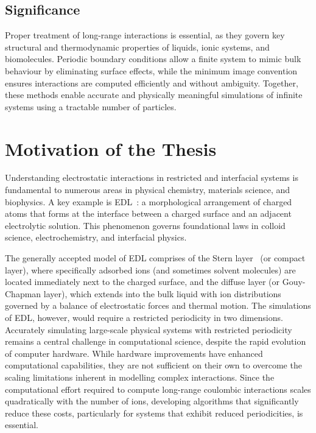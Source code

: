 \subsection{Significance}
Proper treatment of long-range interactions is essential, as they govern key structural and thermodynamic properties of liquids, ionic systems, and biomolecules. Periodic boundary conditions allow a finite system to mimic bulk behaviour by eliminating surface effects, while the minimum image convention ensures interactions are computed efficiently and without ambiguity. Together, these methods enable accurate and physically meaningful simulations of infinite systems using a tractable number of particles.

\section{Motivation of the Thesis}
Understanding electrostatic interactions in restricted and interfacial systems is fundamental to numerous areas in physical chemistry, materials science, and biophysics. A key example is \ac{EDL}~\cite{EDLbook,stillinger1960theory,grahame1947electrical}: a morphological arrangement of charged atoms that forms at the interface between a charged surface and an adjacent electrolytic solution. This phenomenon governs foundational laws in colloid science, electrochemistry, and interfacial physics. 

The generally accepted model of EDL comprises of the Stern layer~\cite{stern1924theorie,helmholtz1853ueber} (or compact layer), where specifically adsorbed ions (and sometimes solvent molecules) are located immediately next to the charged surface, and the diffuse layer (or Gouy-Chapman layer), which extends into the bulk liquid with ion distributions governed by a balance of electrostatic forces and thermal motion. The simulations of EDL, however, would require a restricted periodicity in two dimensions. Accurately simulating large-scale physical systems with restricted periodicity remains a central challenge in computational science, despite the rapid evolution of computer hardware. While hardware improvements have enhanced computational capabilities, they are not sufficient on their own to overcome the scaling limitations inherent in modelling complex interactions. Since the computational effort required to compute long-range coulombic interactions scales quadratically with the number of ions, developing algorithms that significantly reduce these costs, particularly for systems that exhibit reduced periodicities, is essential. 

